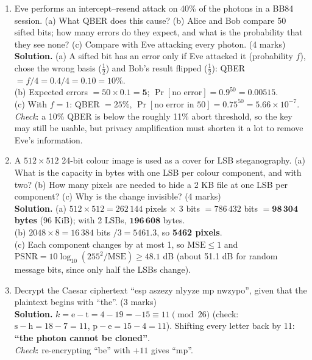 \begin{enumerate}[leftmargin=1.6em,itemsep=4pt]
  \item Eve performs an intercept--resend attack on 40\% of the photons in a BB84 session. (a) What QBER does this cause? (b) Alice and Bob compare 50 sifted bits; how many errors do they expect, and what is the probability that they see none? (c) Compare with Eve attacking every photon. \hfill (4 marks)\\
  \textbf{Solution.} (a) A sifted bit has an error only if Eve attacked it (probability $f$), chose the wrong basis ($\frac12$) and Bob's result flipped ($\frac12$): QBER $= f/4 = 0.4/4 = \mathbf{0.10} = 10\%$.\\
  (b) Expected errors $= 50 \times 0.1 = \mathbf{5}$; $\Pr[\text{no error}] = 0.9^{50} = \mathbf{0.00515}$.\\
  (c) With $f = 1$: QBER $= 25\%$, $\Pr[\text{no error in 50}] = 0.75^{50} = 5.66 \times 10^{-7}$.\\
  \emph{Check}: a 10\% QBER is below the roughly 11\% abort threshold, so the key may still be usable, but privacy amplification must shorten it a lot to remove Eve's information.

  \item A $512 \times 512$ 24-bit colour image is used as a cover for LSB steganography. (a) What is the capacity in bytes with one LSB per colour component, and with two? (b) How many pixels are needed to hide a 2 KB file at one LSB per component? (c) Why is the change invisible? \hfill (4 marks)\\
  \textbf{Solution.} (a) $512 \times 512 = 262\,144$ pixels $\times$ 3 bits $= 786\,432$ bits $= \mathbf{98\,304}$ \textbf{bytes} (96 KiB); with 2 LSBs, $\mathbf{196\,608}$ bytes.\\
  (b) $2048 \times 8 = 16\,384$ bits $/ 3 = 5461.3$, so \textbf{5462 pixels}.\\
  (c) Each component changes by at most 1, so $\mathrm{MSE} \le 1$ and $\mathrm{PSNR} = 10\log_{10}(255^2/\mathrm{MSE}) \ge 48.1$ dB (about 51.1 dB for random message bits, since only half the LSBs change).

  \item Decrypt the Caesar ciphertext ``esp aszezy nlyyze mp nwzypo'', given that the plaintext begins with ``the''. \hfill (3 marks)\\
  \textbf{Solution.} $k = \mathrm{e} - \mathrm{t} = 4 - 19 = -15 \equiv 11 \pmod{26}$ (check: $\mathrm{s} - \mathrm{h} = 18 - 7 = 11$, $\mathrm{p} - \mathrm{e} = 15 - 4 = 11$). Shifting every letter back by 11: \textbf{``the photon cannot be cloned''}.\\
  \emph{Check}: re-encrypting ``be'' with $+11$ gives ``mp''.


\end{enumerate}
